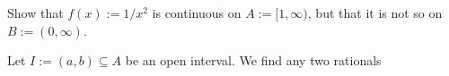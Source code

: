 \documentclass[boxes, qed]{homework}
\begin{document}
\newenvironment{amatrix}[1]{%
  \left[\begin{array}{@{}*{#1}{c}|c@{}}
}{%
  \end{array}\right]
}

\newenvironment{augmatrix}[1]{%
  \left[\begin{array}{#1}
}{%
  \end{array}\right]
}
\begin{problem}Show that $f(x):=1/x^2$ is continuous on $A:=[1,\infty)$,
  but that it is not so on $B:=(0,\infty)$.
\end{problem}
\begin{solution}Let $I:=(a,b)\subseteq{A}$ be an open interval. We find any two rationals 
\end{solution}
\end{document}
